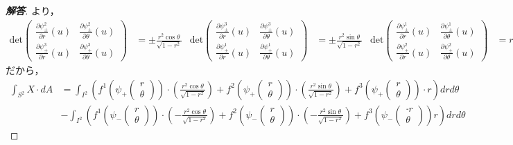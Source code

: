 \documentclass[dvipdfmx,uplatex,nosetpagesize]{jsarticle}
\theoremstyle{definition}
\theoremstyle{StatementsWithStar}
\theoremstyle{StatementsWithStar2}
\theoremstyle{StatementsWithStar3}
\theoremstyle{StatementsWithCCirc}
\theoremstyle{definition}
\begin{document}
\begin{proof}[\bf{解答}]
より，
\begin{align*}
    \mathrm{det}\begin{pmatrix}\frac{\partial\psi^2_\pm}{\partial r}(u)&\frac{\partial\psi^2_\pm}{\partial \theta}(u)\\\frac{\partial\psi^3_\pm}{\partial r}(u)&\frac{\partial\psi^3_\pm}{\partial \theta}(u)\end{pmatrix} &= \pm \frac{r^2\cos\theta}{\sqrt{1-r^2}} &
    \mathrm{det}\begin{pmatrix}\frac{\partial\psi^3_\pm}{\partial r}(u)&\frac{\partial\psi^3_\pm}{\partial \theta}(u)\\\frac{\partial\psi^1_\pm}{\partial r}(u)&\frac{\partial\psi^1_\pm}{\partial \theta}(u)\end{pmatrix} &= \pm \frac{r^2\sin\theta}{\sqrt{1-r^2}} &
    \mathrm{det}\begin{pmatrix}\frac{\partial\psi^1_\pm}{\partial r}(u)&\frac{\partial\psi^1_\pm}{\partial \theta}(u)\\\frac{\partial\psi^2_\pm}{\partial r}(u)&\frac{\partial\psi^2_\pm}{\partial \theta}(u)\end{pmatrix} &= r
\end{align*}
だから，
\begin{align*}
    \int_{S^2}X\cdot dA &= \int_{I^2} \left(f^1\left(\psi_+\begin{pmatrix}r\\\theta\end{pmatrix}\right)\cdot\left(\frac{r^2\cos\theta}{\sqrt{1-r^2}}\right)+f^2\left(\psi_+\begin{pmatrix}r\\\theta\end{pmatrix}\right)\cdot\left(\frac{r^2\sin\theta}{\sqrt{1-r^2}}\right)+f^3\left(\psi_+\begin{pmatrix}r\\\theta\end{pmatrix}\right)\cdot r \right)drd\theta \\
    &- \int_{I^2} \left(f^1\left(\psi_-\begin{pmatrix}r\\\theta\end{pmatrix}\right)\cdot\left(-\frac{r^2\cos\theta}{\sqrt{1-r^2}}\right)+f^2\left(\psi_-\begin{pmatrix}r\\\theta\end{pmatrix}\right)\cdot\left(-\frac{r^2\sin\theta}{\sqrt{1-r^2}}\right)+f^3\left(\psi_-\begin{pmatrix}\cdot r\\\theta\end{pmatrix}\right)r \right)drd\theta
\end{align*}


\end{proof}
\end{document}
